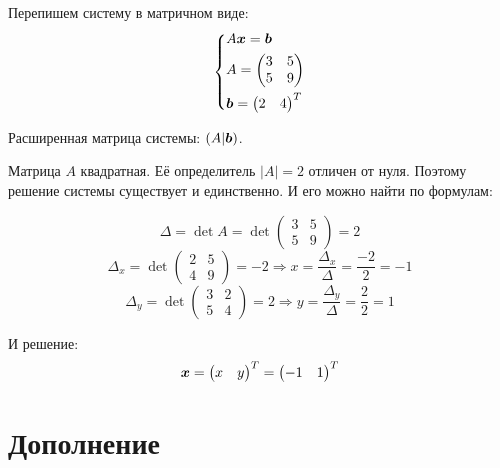 \documentclass[a4paper,12pt]{article}
\begin{document}
  \begin{solution}
    Перепишем систему в матричном виде:
    \[
      \left\{
        \begin{aligned}
          &A \boldsymbol x = \boldsymbol b\\
          &A = \begin{pmatrix}
            3 & 5\\
            5 & 9
          \end{pmatrix}\\
          &\boldsymbol b = \begin{pmatrix}
            2 & 4
          \end{pmatrix}^T
        \end{aligned}
      \right.
    \]
    
    Расширенная матрица системы: $(A | \boldsymbol b)$.
    
    Матрица $A$ квадратная.
    Её определитель $|A| = 2$ отличен от нуля.
    Поэтому решение системы существует и единственно.
    И его можно найти по формулам:
    
    \[
      \Delta = \det A = \det \begin{pmatrix}
        3 & 5\\
        5 & 9
      \end{pmatrix} = 2
    \]
    \[
      \Delta_x = \det \begin{pmatrix}
        2 & 5\\
        4 & 9
      \end{pmatrix} = -2 \Rightarrow x = \frac{\Delta_x}{\Delta} = \frac{-2}{2} = -1
    \]
    \[
      \Delta_y = \det \begin{pmatrix}
        3 & 2\\
        5 & 4
      \end{pmatrix} = 2 \Rightarrow y = \frac{\Delta_y}{\Delta} = \frac{2}{2} = 1
    \]
    
    И решение:
    \[
      \boldsymbol x = \begin{pmatrix}
        x & y
      \end{pmatrix}^T = \begin{pmatrix}
        -1 & 1
      \end{pmatrix}^T
    \]
  \end{solution}
  
  
  \newpage
  
  
  \section{Дополнение}
  
\end{document}
